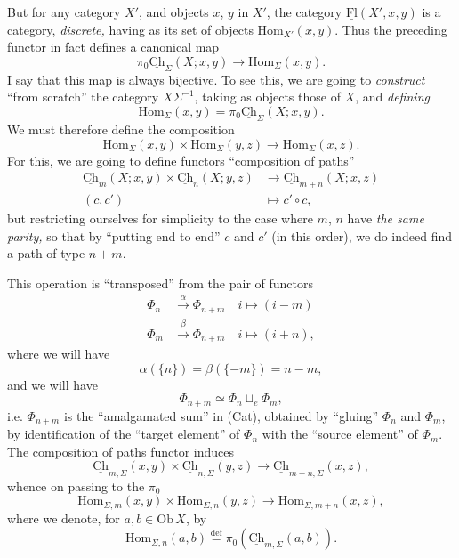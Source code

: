 \documentclass[11pt]{article}
\newcommand{\printedpage}[1]{\marginpar{\footnotesize p.~#1}}
\newcommand{\msp}[1]{\marginpar{\footnotesize [#1]}}
\newcommand{\uCh}{\underline{\mathrm{Ch}}}
\newcommand{\uFl}{\underline{\mathrm{Fl}}}
\newcommand{\Hom}{\mathrm{Hom}}
\begin{document}
But for any category $X'$, and objects $x$, $y$ in $X'$, the category $\uFl(X',x,y)$ is
\msp{page 8}
a category, \textit{discrete,} having as its set of objects $\Hom_{X'}(x,y)$. Thus the preceding functor in fact defines a canonical map %
\[
\boxed{\pi_0\uCh_\Sigma(X;x,y)\longrightarrow\Hom_\Sigma(x,y).}
\]
I say that this map is always bijective. To see this, we are going to \textit{construct} ``from scratch'' the category $X\Sigma^{-1}$, taking as objects those of $X$, and \textit{defining} %
\[
\boxed{\Hom_\Sigma(x,y)=\pi_0\uCh_\Sigma(X;x,y).}
\]
We must therefore define the composition
\[
\Hom_\Sigma(x,y)\times\Hom_\Sigma(y,z)\longrightarrow\Hom_\Sigma(x,z).
\]
For this, we are going to define functors ``composition of paths''
\[
\begin{aligned}
\uCh_m(X;x,y)\times\uCh_n(X;y,z) &\longrightarrow \uCh_{m+n}(X;x,z)\\
(c,c') &\longmapsto c'\circ c,
\end{aligned}
\]
but restricting ourselves for simplicity to the case where $m$, $n$ have \textit{the same parity,} so that by ``putting end to end'' $c$ and $c'$ (in this order), we do indeed find a path of type $n+m$.

\msp{page 9}
This operation is ``transposed'' from the pair of functors
\[
\begin{aligned}
\Phi_n &\xrightarrow{\alpha} \Phi_{n+m}\quad i\longmapsto (i-m)\\
\Phi_m &\xrightarrow{\beta} \Phi_{n+m}\quad i\longmapsto (i+n),
\end{aligned}
\]
\printedpage{7}
where we will have
\[
\alpha(\{n\})=\beta(\{-m\})=n-m,
\]
and we will have
\[
\Phi_{n+m}\simeq\Phi_n\sqcup_e\Phi_m,
\]
i.e. $\Phi_{n+m}$ is the ``amalgamated sum'' in (Cat), obtained by ``gluing'' $\Phi_n$ and $\Phi_m$, by identification of the ``target element'' of $\Phi_n$ with the ``source element'' of $\Phi_m$. The composition of paths functor induces
\[
\uCh_{m,\Sigma}(x,y)\times\uCh_{n,\Sigma}(y,z)\longrightarrow\uCh_{m+n,\Sigma}(x,z),
\]
whence on passing to the $\pi_0$
\[
\Hom_{\Sigma,m}(x,y)\times\Hom_{\Sigma,n}(y,z)\longrightarrow\Hom_{\Sigma,m+n}(x,z),
\]
where we denote, for $a,b\in\mathrm{Ob}\,X$, by
\[
\Hom_{\Sigma,n}(a,b)\overset{\text{def}}{=}\pi_0(\uCh_{m,\Sigma}(a,b)).
\]
\end{document}
